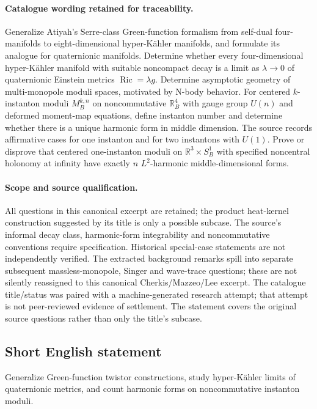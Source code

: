 \documentclass[11pt]{article}
\begin{document}
\paragraph{Catalogue wording retained for traceability.}
Generalize Atiyah’s Serre-class Green-function formalism from self-dual four-manifolds to eight-dimensional hyper-Kähler manifolds, and formulate its analogue for quaternionic manifolds. Determine whether every four-dimensional hyper-Kähler manifold with suitable noncompact decay is a limit as $\lambda\to0$ of quaternionic Einstein metrics $\operatorname{Ric}=\lambda g$. Determine asymptotic geometry of multi-monopole moduli spaces, motivated by N-body behavior. For centered $k$-instanton moduli $M_B^{k,n}$ on noncommutative $\mathbb R_B^4$ with gauge group $U(n)$ and deformed moment-map equations, define instanton number and determine whether there is a unique harmonic form in middle dimension. The source records affirmative cases for one instanton and for two instantons with $U(1)$. Prove or disprove that centered one-instanton moduli on $\mathbb R^3\times S_B^1$ with specified noncentral holonomy at infinity have exactly $n$ $L^2$-harmonic middle-dimensional forms.
\paragraph{Scope and source qualification.}All questions in this canonical excerpt are retained; the product heat-kernel construction suggested by its title is only a possible subcase. The source’s informal decay class, harmonic-form integrability and noncommutative conventions require specification. Historical special-case statements are not independently verified. The extracted background remarks spill into separate subsequent massless-monopole, Singer and wave-trace questions; these are not silently reassigned to this canonical Cherkis/Mazzeo/Lee excerpt. The catalogue title/status was paired with a machine-generated research attempt; that attempt is not peer-reviewed evidence of settlement. The statement covers the original source questions rather than only the title’s subcase.
\subsection{Short English statement}
Generalize Green-function twistor constructions, study hyper-Kähler limits of quaternionic metrics, and count harmonic forms on noncommutative instanton moduli.
\end{document}
